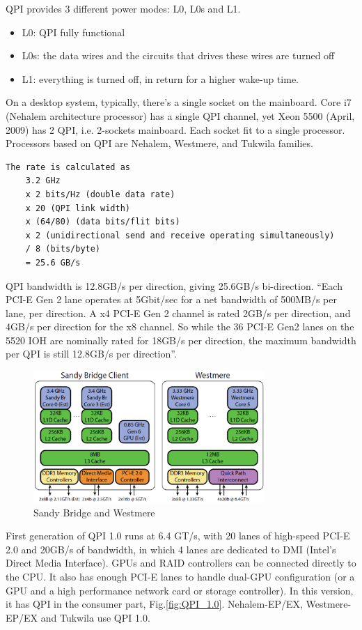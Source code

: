 QPI provides 3 different power modes: L0, L0s and L1. 
\begin{itemize}
  \item L0: QPI fully functional
  \item L0s: the data wires and the circuits that drives these wires are turned
  off
  \item L1: everything is turned off, in return for a higher wake-up time.
\end{itemize}


On a desktop system, typically, there's a single socket on the mainboard. Core
i7 (Nehalem architecture processor) has a single QPI channel, yet Xeon 5500
(April, 2009) has 2 QPI, i.e. 2-sockets mainboard. Each socket fit to a single
processor. Processors based on QPI are Nehalem, Westmere, and Tukwila families.

\begin{verbatim}
The rate is calculated as
    3.2 GHz
    x 2 bits/Hz (double data rate)
    x 20 (QPI link width)
    x (64/80) (data bits/flit bits)
    x 2 (unidirectional send and receive operating simultaneously)
    / 8 (bits/byte)
    = 25.6 GB/s 
\end{verbatim} 
QPI bandwidth is 12.8GB/s per direction, giving 25.6GB/s bi-direction. ``Each
PCI-E Gen 2 lane operates at 5Gbit/sec for a net bandwidth of 500MB/s per lane,
per direction. A x4 PCI-E Gen 2 channel is rated 2GB/s per direction, and 4GB/s
per direction for the x8 channel. So while the 36 PCI-E Gen2 lanes on the 5520
IOH are nominally rated for 18GB/s per direction, the maximum bandwidth per QPI
is still 12.8GB/s per direction''.

\begin{figure}[hbt]
  \centerline{\includegraphics[height=5cm,
    angle=0]{./images/sandybridge_westmere.eps}}
  \caption{Sandy Bridge and Westmere}
  \label{fig:SandyBridge_Westmere}
\end{figure}

First generation of QPI 1.0 runs at 6.4 GT/s, with 20 lanes of high-speed PCI-E
2.0 and 20GB/s of bandwidth, in which 4 lanes are dedicated to DMI (Intel's Direct Media
Interface). GPUs and RAID controllers can be connected directly to the CPU. It
also has enough PCI-E lanes to handle dual-GPU configuration (or a GPU and a
high performance network card or storage controller). In this version, it has
QPI in the consumer part, Fig.\ref{fig:QPI_1.0}. Nehalem-EP/EX, Westmere-EP/EX
and Tukwila use QPI 1.0.

